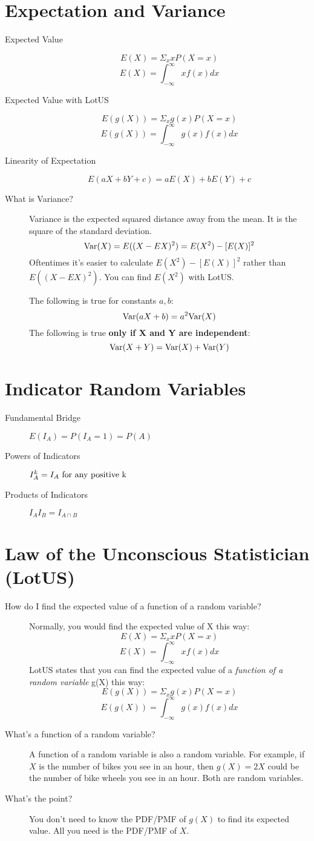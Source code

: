 \documentclass[11pt]{article}
\begin{document}
\section*{Expectation and Variance}
\begin{description}
  \item[Expected Value] \[E(X) = \Sigma_x xP(X=x) \] \[E(X) = \int^\infty_{-\infty}xf(x)dx \]
  \item[Expected Value with LotUS] \[E(g(X)) = \Sigma_x g(x)P(X=x) \] \[E(g(X)) = \int^\infty_{-\infty}g(x)f(x)dx \]
  \item[Linearity of Expectation] \[E(aX + bY + c) = aE(X) + bE(Y) + c\]
\item[What is Variance?] Variance is the expected squared distance away from the mean. It is the square of the standard deviation.
\[\textrm{Var}(X) = E((X - EX)^2) = E(X^2) - [E(X)]^2 \]
Oftentimes it's easier to calculate $E(X^2) - [E(X)]^2$ rather than $E((X - EX)^2)$. You can find $E(X^2)$ with LotUS.

The following is true for constants $a, b$:
\[\textrm{Var}(aX + b) = a^2\textrm{Var}(X)\]
The following is true \textbf{only if X and Y are independent}:
\[\textrm{Var}(X + Y) = \textrm{Var}(X) + \textrm{Var}(Y)\]
\end{description}

\section*{Indicator Random Variables}
\begin{description}
  \item[Fundamental Bridge]
    $E(I_A) = P(I_A = 1) = P(A)$
  \item[Powers of Indicators]
    $I_A^k = I_A \textnormal{ for any positive k}$
  \item[Products of Indicators]
    $I_AI_B = I_{A \cap B}$
\end{description}

\section*{Law of the Unconscious Statistician (LotUS)}
\begin{description}
\item[How do I find the expected value of a function of a random variable?]
Normally, you would find the expected value of X this way:
\[E(X) = \Sigma_x xP(X=x) \]
\[E(X) = \int^\infty_{-\infty}xf(x)dx \]
LotUS states that you can find the expected value of a \emph{function of a random variable} g(X) this way:
\[E(g(X)) = \Sigma_x g(x)P(X=x) \]
\[E(g(X)) = \int^\infty_{-\infty}g(x)f(x)dx \]
\item[What's a function of a random variable?] A function of a random variable is also a random variable. For example, if $X$ is the number of bikes you see in an hour, then $g(X) =  2X$ could be the number of bike wheels you see in an hour. Both are random variables.
\item[What's the point?] You don't need to know the PDF/PMF of $g(X)$ to find its expected value. All you need is the PDF/PMF of $X$.
\end{description}
\end{document}
